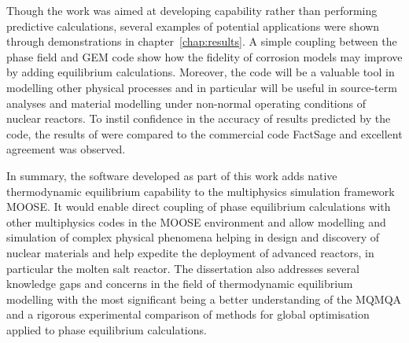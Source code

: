 	Though the work was aimed at developing capability rather than performing predictive calculations, several examples of potential applications were shown through demonstrations in chapter~\ref{chap:results}. A simple coupling between the phase field and GEM code show how the fidelity of corrosion models may improve by adding equilibrium calculations. Moreover, the code will be a valuable tool in modelling other physical processes and in particular will be useful in source-term analyses and material modelling under non-normal operating conditions of nuclear reactors. To instil confidence in the accuracy of results predicted by the code, the results of {\GEM} were compared to the commercial code FactSage and excellent agreement was observed.
	
	In summary, the software developed as part of this work adds native thermodynamic equilibrium capability to the multiphysics simulation framework MOOSE. It would enable direct coupling of phase equilibrium calculations with other multiphysics codes in the MOOSE environment and allow modelling and simulation of complex physical phenomena helping in design and discovery of nuclear materials and help expedite the deployment of advanced reactors, in particular the molten salt reactor. The dissertation also addresses several knowledge gaps and concerns in the field of thermodynamic equilibrium modelling with the most significant being a better understanding of the MQMQA and a rigorous experimental comparison of methods for global optimisation applied to phase equilibrium calculations.
	
	
	